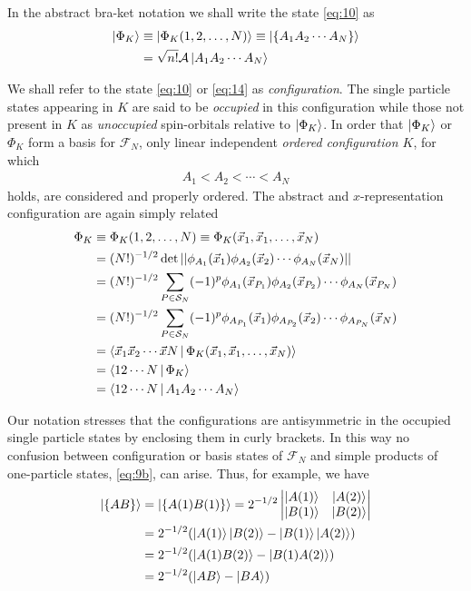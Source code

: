 \documentclass{book}
\renewcommand{\braket}[1]{\Braket{#1}}
\renewcommand{\ket}[1]{\Ket{#1}}
\begin{document}
In the abstract bra-ket notation we shall write the state \eqref{eq:10} as 
\begin{align}
    \ket{\Phi_K} & \equiv \ket{\Phi_K(1,2,\ldots,N)} \equiv \ket{\{A_1A_2\cdots A_N\}}\notag\\
                 & = \sqrt{n!}\mathcal{A}\ket{A_1A_2\cdots A_N}
    \label{eq:14}
\end{align}

We shall refer to the state \eqref{eq:10} or \eqref{eq:14} as \emph{configuration}. The single particle states appearing in $K$ are said to be \emph{occupied} in this configuration while those not present in $K$ as \emph{unoccupied} spin-orbitals relative to $\ket{\Phi_K}$. In order that $\ket{\Phi_K}$ or ${\Phi_K}$ form a basis for $\mathcal{F}_N$, only linear independent \emph{ordered configuration $K$}, for which 
\begin{align}
    A_1<A_2<\cdots<A_N
\end{align}
holds, are considered and properly ordered. The abstract and $x$-representation configuration are again simply related 
\begin{align}
    \Phi_K & \equiv \Phi_K(1,2,\ldots,N) \equiv \Phi_K(\vec{x}_1,\vec{x}_1,\ldots,\vec{x}_N)\notag\\
    &=(N!)^{-1/2}\det||\phi_{A_1}(\vec{x}_1)\phi_{A_2}(\vec{x}_2)\cdots\phi_{A_N}(\vec{x}_N)|| \notag\\
    &=(N!)^{-1/2}\sum_{P\in \mathcal{S}_N}(-1)^p \phi_{A_1}(\vec{x}_{P_1})\phi_{A_2}(\vec{x}_{P_2})\cdots\phi_{A_N}(\vec{x}_{P_N})\notag\\
    &=(N!)^{-1/2}\sum_{P\in \mathcal{S}_N}(-1)^p \phi_{A_{P_1}}(\vec{x}_1)\phi_{A_{P_2}}(\vec{x}_{2})\cdots\phi_{A_{P_N}}(\vec{x}_{N})\notag\\
    &=\braket{\vec{x}_1\vec{x}_2\cdots\vec{x}N|\Phi_K(\vec{x}_1,\vec{x}_1,\ldots,\vec{x}_N)}\notag\\
    &=\braket{12\cdots N|\Phi_K}\notag\\
    &=\braket{12\cdots N|A_1A_2\cdots A_N}
    \label{eq:16}
\end{align}

Our notation stresses that the configurations are antisymmetric in the occupied single particle states by enclosing them in curly brackets. In this way no confusion between configuration or basis states of $\mathcal{F}_N$ and simple products of one-particle states, \eqref{eq:9b}, can arise. Thus, for example, we have 
\begin{align}
    \ket{\{AB\}}&=\ket{\{A(1)B(1)\}} = 2^{-1/2}
    \begin{vmatrix}
        \ket{A(1)} & \ket{A(2)}\\
        \ket{B(1)} & \ket{B(2)}
    \end{vmatrix}\\
                &=2^{-1/2}(\ket{A(1)}\ket{B(2)}-\ket{B(1)}\ket{A(2)})\\
                &=2^{-1/2}(\ket{A(1)B(2)}-\ket{B(1)A(2)})\\
                &=2^{-1/2}(\ket{AB}-\ket{BA})
\end{align}
\end{document}

